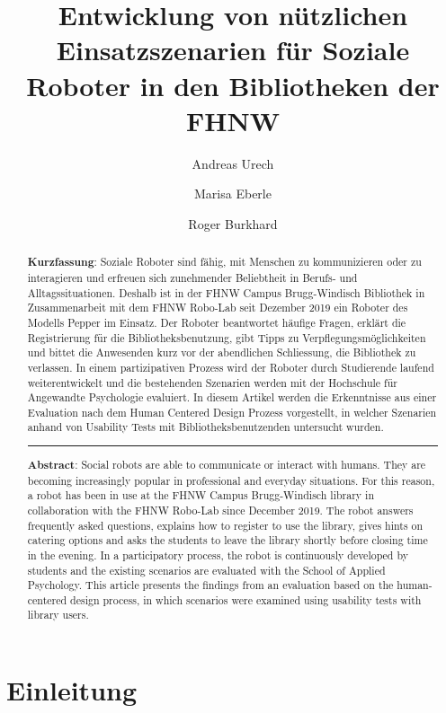 \documentclass[a4paper,
fontsize=11pt,
oneside,
numbers=noperiodatend,
parskip=half-,
bibliography=totoc,
final
]{scrartcl}
\title{\LARGE{Entwicklung von nützlichen Einsatzszenarien für Soziale Roboter in den Bibliotheken der FHNW}}%
\author{Andreas Urech \and Marisa Eberle \and  Roger Burkhard} %
\date{}
\begin{document}
\maketitle
\thispagestyle{fancyplain} 

\begin{abstract}
\noindent
\textbf{Kurzfassung}: Soziale Roboter sind fähig, mit Menschen zu
kommunizieren oder zu interagieren und erfreuen sich zunehmender
Beliebtheit in Berufs- und Alltagssituationen. Deshalb ist in der FHNW
Campus Brugg-Windisch Bibliothek in Zusammenarbeit mit dem FHNW Robo-Lab
seit Dezember 2019 ein Roboter des Modells Pepper im Einsatz. Der
Roboter beantwortet häufige Fragen, erklärt die Registrierung für die
Bibliotheksbenutzung, gibt Tipps zu Verpflegungsmöglichkeiten und bittet
die Anwesenden kurz vor der abendlichen Schliessung, die Bibliothek zu
verlassen. In einem partizipativen Prozess wird der Roboter durch
Studierende laufend weiterentwickelt und die bestehenden Szenarien
werden mit der Hochschule für Angewandte Psychologie evaluiert. In
diesem Artikel werden die Erkenntnisse aus einer Evaluation nach dem
Human Centered Design Prozess vorgestellt, in welcher Szenarien anhand
von Usability Tests mit Bibliotheksbenutzenden untersucht wurden.

\begin{center}\rule{0.5\linewidth}{0.5pt}\end{center}

\noindent \textbf{Abstract}: Social robots are able to communicate or interact
with humans. They are becoming increasingly popular in professional and
everyday situations. For this reason, a robot has been in use at the
FHNW Campus Brugg-Windisch library in collaboration with the FHNW
Robo-Lab since December 2019. The robot answers frequently asked
questions, explains how to register to use the library, gives hints on
catering options and asks the students to leave the library shortly
before closing time in the evening. In a participatory process, the
robot is continuously developed by students and the existing scenarios
are evaluated with the School of Applied Psychology. This article
presents the findings from an evaluation based on the human-centered
design process, in which scenarios were examined using usability tests
with library users.
\end{abstract}

\hypertarget{einleitung}{%
\section{Einleitung}\label{einleitung}}
\end{document}
